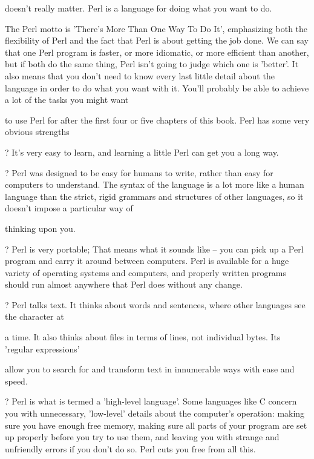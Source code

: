 \documentclass[a4paper,11pt]{book}
\begin{document}
\noindent doesn't really matter. Perl is a language for doing what you want to do.

\noindent 

\noindent The Perl motto is 'There's More Than One Way To Do It', emphasizing both the flexibility of Perl and the fact that Perl is about getting the job done. We can say that one Perl program is faster, or more idiomatic, or more efficient than another, but if both do the same thing, Perl isn't going to judge which one is 'better'. It also means that you don't need to know every last little detail about the language in order to do what you want with it. You'll probably be able to achieve a lot of the tasks you might want

\noindent to use Perl for after the first four or five chapters of this book. Perl has some very obvious strengths

\noindent ? It's very easy to learn, and learning a little Perl can get you a long way.

\noindent ? Perl was designed to be easy for humans to write, rather than easy for computers to understand. The syntax of the language is a lot more like a human language than the strict, rigid grammars and structures of other languages, so it doesn't impose a particular way of

\noindent thinking upon you.

\noindent ? Perl is very portable; That means what it sounds like -- you can pick up a Perl program and carry it around between computers. Perl is available for a huge variety of operating systems and computers, and properly written programs should run almost anywhere that Perl does without any change.

\noindent ? Perl talks text. It thinks about words and sentences, where other languages see the character at

\noindent a time. It also thinks about files in terms of lines, not individual bytes. Its 'regular expressions'

\noindent allow you to search for and transform text in innumerable ways with ease and speed.

\noindent ? Perl is what is termed a 'high-level language'. Some languages like C concern you with unnecessary, 'low-level' details about the computer's operation: making sure you have enough free memory, making sure all parts of your program are set up properly before you try to use them, and leaving you with strange and unfriendly errors if you don't do so. Perl cuts you free from all this.
\end{document}
